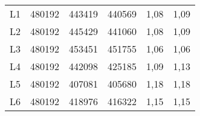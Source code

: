 \begin{center}
\begin{longtable}{cccccc}
    L1    & 480192 & 443419 & 440569 & 1,08  & 1,09 \\
    L2    & 480192 & 445429 & 441060 & 1,08  & 1,09 \\
    L3    & 480192 & 453451 & 451755 & 1,06  & 1,06 \\
    L4    & 480192 & 442098 & 425185 & 1,09  & 1,13 \\
    L5    & 480192 & 407081 & 405680 & 1,18  & 1,18 \\
    L6    & 480192 & 418976 & 416322 & 1,15  & 1,15 \\
\end{longtable}
\end{center}

%  
% 
% 


